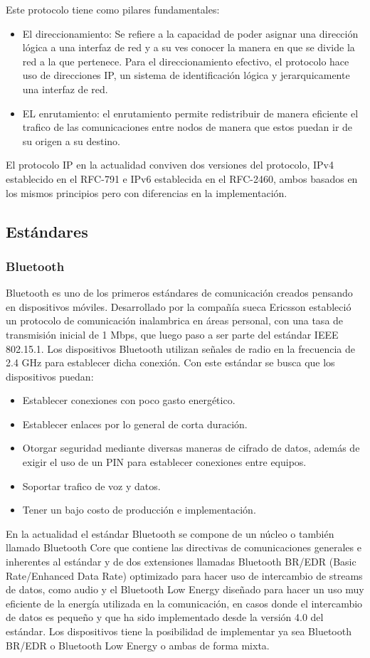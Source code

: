 Este protocolo tiene como pilares fundamentales:
\begin{itemize}
\item El direccionamiento: Se refiere a la capacidad de poder asignar una dirección lógica a una interfaz de red y a su ves conocer  la manera en que se divide la red a la que pertenece.  Para el direccionamiento efectivo, el protocolo hace uso de direcciones IP, un sistema de identificación lógica y jerarquicamente una interfaz de red.
\item EL enrutamiento: el enrutamiento permite redistribuir de manera eficiente el trafico de las comunicaciones entre nodos de manera que estos puedan ir de su origen a su destino.
\end{itemize}
 
El protocolo IP en la actualidad conviven dos versiones del protocolo, IPv4 establecido en el RFC-791\cite{rfc791} e IPv6 establecida en el RFC-2460\cite{rfc2460}, ambos basados en los mismos principios pero con diferencias en la implementación.

\subsection{Estándares}
\subsubsection{Bluetooth}
Bluetooth es uno de los primeros estándares de comunicación creados pensando en dispositivos móviles. Desarrollado por la compañía sueca Ericsson estableció un protocolo de comunicación inalambrica en áreas personal, con una tasa de transmisión inicial de 1 Mbps, que luego paso a ser parte del estándar IEEE 802.15.1\cite{ieeebluetooth}. Los dispositivos Bluetooth utilizan señales de radio en la frecuencia de 2.4 GHz para establecer dicha conexión.  Con este estándar se busca que los dispositivos puedan:
\begin{itemize}
\item Establecer conexiones con poco gasto energético.
\item Establecer enlaces por lo general de corta duración.
\item Otorgar seguridad mediante diversas maneras de cifrado de datos, además de exigir el uso de un PIN para establecer conexiones entre equipos.
\item Soportar trafico de voz y datos.
\item Tener un bajo costo de producción e implementación.
\end{itemize}
En la actualidad el estándar Bluetooth se compone de un núcleo o también llamado Bluetooth Core que contiene las directivas de comunicaciones generales e inherentes al estándar y de dos extensiones llamadas Bluetooth BR/EDR (Basic Rate/Enhanced Data Rate) optimizado para hacer uso de intercambio de streams de datos, como audio y el Bluetooth Low Energy diseñado para hacer un uso muy eficiente de la energía utilizada en la comunicación, en casos donde el intercambio de datos es pequeño y que ha sido implementado desde la versión 4.0 del estándar. Los dispositivos tiene la posibilidad de implementar ya sea Bluetooth BR/EDR o Bluetooth Low Energy o ambas de forma mixta.\\

